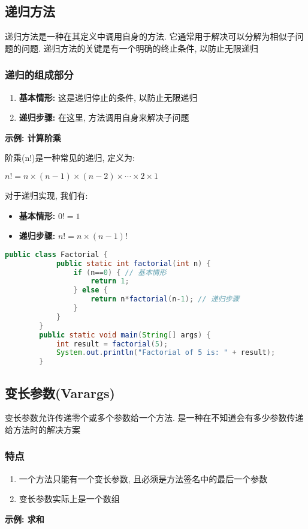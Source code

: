 \documentclass{article}
\begin{document}
\subsection{ 递归方法}
递归方法是一种在其定义中调用自身的方法. 它通常用于解决可以分解为相似子问题的问题. 递归方法的关键是有一个明确的终止条件, 以防止无限递归
\subsubsection{ 递归的组成部分}
\begin{enumerate}
    \item \textbf{基本情形:} 这是递归停止的条件, 以防止无限递归
    \item \textbf{递归步骤:} 在这里, 方法调用自身来解决子问题
\end{enumerate}
\textbf{示例: 计算阶乘}

阶乘(n!)是一种常见的递归, 定义为: 

\(n! = n \times (n-1) \times (n-2) \times \cdots \times 2 \times 1\)

对于递归实现, 我们有: 

\begin{itemize}
    \item \textbf{基本情形:} \(0! = 1\)
    \item \textbf{递归步骤:} \(n! = n \times (n-1)!\)
\end{itemize}
\begin{tcolorbox}
    \begin{lstlisting}[language=java]
        public class Factorial {
            public static int factorial(int n) {
                if (n==0) { // 基本情形
                    return 1;
                } else {
                    return n*factorial(n-1); // 递归步骤
                }
            }
        }  
        public static void main(String[] args) {
            int result = factorial(5);
            System.out.println("Factorial of 5 is: " + result);
        }
    \end{lstlisting}
\end{tcolorbox}
\subsection{ 变长参数(Varargs)}
变长参数允许传递零个或多个参数给一个方法. 是一种在不知道会有多少参数传递给方法时的解决方案

\subsubsection{ 特点}
\begin{enumerate}
    \item 一个方法只能有一个变长参数, 且必须是方法签名中的最后一个参数
    \item 变长参数实际上是一个数组
\end{enumerate}
\textbf{示例: 求和}
\end{document}
